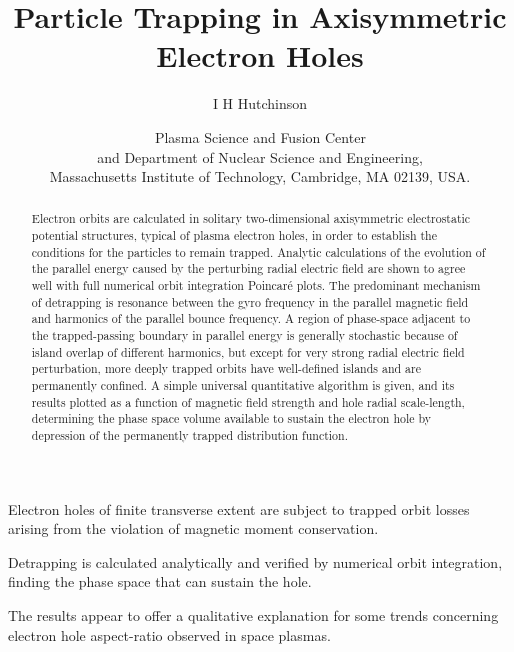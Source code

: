 \documentclass{agujournal2019}
\date{}
\def\maketitle{}
\def\dateskip{}
\def\authors#1{\author{#1}}
\def\affiliation#1#2{\date{$^{#1}$#2}}
\def\dateskip{\medskip}
\begin{document}
\title{Particle Trapping in Axisymmetric Electron Holes}
\authors{I H Hutchinson}
\affiliation{}{Plasma Science and Fusion Center\\ and
Department of Nuclear Science and Engineering,\\ \dateskip
Massachusetts Institute of Technology, Cambridge, MA 02139, USA.}

\maketitle

\ifagu
\begin{keypoints}
\item Electron holes of finite transverse extent are subject to trapped orbit
losses arising from the violation of magnetic moment conservation.
\item  Detrapping is calculated analytically and verified by numerical
orbit integration, finding the phase space that can sustain the hole.
\item The results appear to offer a qualitative explanation for some
trends concerning electron hole aspect-ratio observed in space
plasmas.
\end{keypoints}
\fi

\begin{abstract}
  Electron orbits are calculated in solitary two-dimensional
  axisymmetric electrostatic potential structures, typical of plasma
  electron holes, in order to establish the conditions for the
  particles to remain trapped.  Analytic calculations of the evolution
  of the parallel energy caused by the perturbing radial electric
  field are shown to agree well with full numerical orbit integration
  Poincar\'e plots. The predominant mechanism of detrapping is
  resonance between the gyro frequency in the parallel magnetic field
  and harmonics of the parallel bounce frequency. A region of
  phase-space adjacent to the trapped-passing boundary in parallel
  energy is generally stochastic because of island overlap of
  different harmonics, but except for very strong radial electric
  field perturbation, more deeply trapped orbits have well-defined
  islands and are permanently confined. A simple universal
  quantitative algorithm is given, and its results plotted as a
  function of magnetic field strength and hole radial scale-length,
  determining the phase space volume available to sustain the electron
  hole by depression of the permanently trapped distribution function.
\end{abstract}
\end{document}

